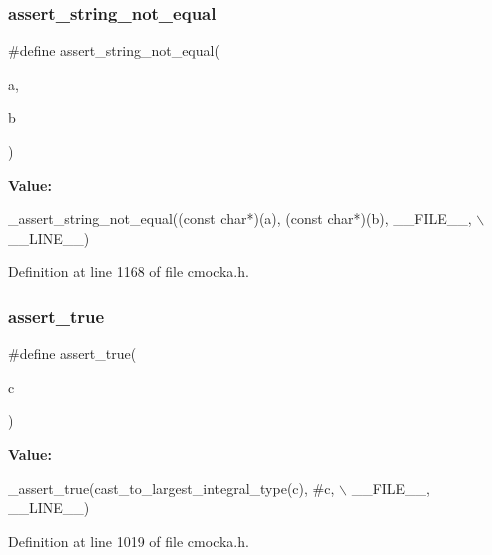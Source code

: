 \subsubsection{\texorpdfstring{assert\+\_\+string\+\_\+not\+\_\+equal}{assert\_string\_not\_equal}}
{\footnotesize\ttfamily \#define assert\+\_\+string\+\_\+not\+\_\+equal(\begin{DoxyParamCaption}\item[{}]{a,  }\item[{}]{b }\end{DoxyParamCaption})}

{\bfseries Value\+:}
\begin{DoxyCode}
\_assert\_string\_not\_equal((\textcolor{keyword}{const} \textcolor{keywordtype}{char}*)(a), (\textcolor{keyword}{const} \textcolor{keywordtype}{char}*)(b), \_\_FILE\_\_, \(\backslash\)
                             \_\_LINE\_\_)
\end{DoxyCode}


Definition at line 1168 of file cmocka.\+h.

\mbox{\label{group__cmocka__asserts_gafaacfa3c89570db4347841e4497d3636}} 
\subsubsection{\texorpdfstring{assert\+\_\+true}{assert\_true}}
{\footnotesize\ttfamily \#define assert\+\_\+true(\begin{DoxyParamCaption}\item[{}]{c }\end{DoxyParamCaption})}

{\bfseries Value\+:}
\begin{DoxyCode}
\_assert\_true(cast\_to\_largest\_integral\_type(c), #c, \(\backslash\)
                                    \_\_FILE\_\_, \_\_LINE\_\_)
\end{DoxyCode}


Definition at line 1019 of file cmocka.\+h.

